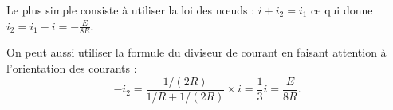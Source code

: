 \begin{corrige} 
	Le plus simple consiste à utiliser la loi des n\oe uds : $i+i_2=i_1$ ce qui donne $i_2=i_1-i=-\frac{E}{8R}$.
	
	On peut aussi utiliser la formule du diviseur de courant en faisant attention à l'orientation des courants : 
	\[
		-i_2=\frac{1/(2R)}{1/R+1/(2R)}\times i=\frac13 i=\frac{E}{8R}.		
	\]
\end{corrige}


\finEntrainement














\afficheReponsesMelangees

\finFicheEntrainement                                                                        %


\ifdefined\mainIsLoaded\else
\printReponsesEtCorriges
\fi





















